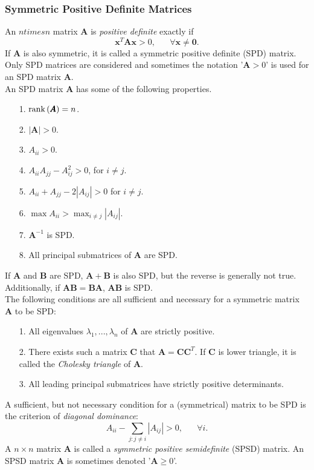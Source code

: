 \documentclass[12pt]{book}
\begin{document}
\subsubsection*{Symmetric Positive Definite Matrices}
An $n times n$ matrix $\pmb{A}$ is \textit{positive definite} exactly if
\begin{equation*}
    \pmb{x}^T\pmb{A}\pmb{x}>0,\hspace{20pt}\forall\pmb{x}\neq\pmb{0}.
\end{equation*}
If $\pmb{A}$ is also symmetric, it is called a symmetric positive definite (SPD) matrix. Only SPD matrices are considered and sometimes the notation '$\pmb{A}>0$' is used for an SPD matrix $\pmb{A}$. \\
An SPD matrix $\pmb{A}$ has some of the following properties.
\begin{itemize}
    \item[1.] $\hbox{rank}\left(\pmb{A}\right)=n$.
    \item[2.] $|\pmb{A}|>0$.
    \item[3.] $A_{ii}>0$.
    \item[4.] $A_{ii}A_{jj}-A_{ij}^2>0$, for $i\neq j$.
    \item[5.] $A_{ii} + A_{jj}-2|A_{ij}|>0$ for $i\neq j$.
    \item[6.] $\max A_{ii}>\max_{i\neq j}|A_{ij}|$.
    \item[7.] $\pmb{A}^{-1}$ is SPD.
    \item[8.] All principal submatrices of $\pmb{A}$ are SPD.
\end{itemize}
If $\pmb{A}$ and $\pmb{B}$ are SPD, $\pmb{A}+\pmb{B}$ is also SPD, but the reverse is generally not true. Additionally, if $\pmb{AB}=\pmb{BA}$, $\pmb{AB}$ is SPD. \\
The following conditions are all sufficient and necessary for a symmetric matrix $\pmb{A}$ to be SPD:
\begin{itemize}
    \item[1.] All eigenvalues $\lambda_1,...,\lambda_n$ of $\pmb{A}$ are strictly positive.
    \item[2.] There exists such a matrix $\pmb{C}$ that $\pmb{A}=\pmb{CC}^T$. If $\pmb{C}$ is lower triangle, it is called the \textit{Cholesky triangle} of $\pmb{A}$.
    \item[3.] All leading principal submatrices have strictly positive determinants.
\end{itemize}    
A sufficient, but not necessary condition for a (symmetrical) matrix to be SPD is the criterion of \textit{diagonal dominance}:
    \begin{equation*}
        A_{ii}-\sum_{j:j\neq i}|A_{ij}|>0,\hspace{20pt}\forall i.
    \end{equation*}
    A $n\times n$ matrix $\pmb{A}$ is called a \textit{symmetric positive semidefinite} (SPSD) matrix. An SPSD matrix $\pmb{A}$ is sometimes denoted '$\pmb{A}\geq0$'\autocite[Cf.][]{rue2005gaussian}.
\clearpage
\end{document}
